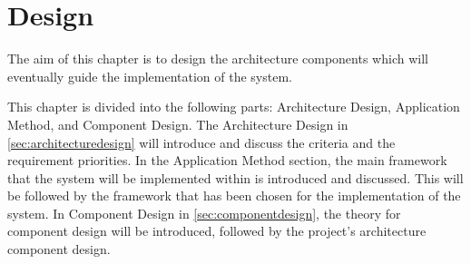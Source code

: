 \chapter{Design}\label{design}
The aim of this chapter is to design the architecture components which will eventually guide the implementation of the system.

This chapter is divided into the following parts: Architecture Design, Application Method, and Component Design.
The Architecture Design in \cref{sec:architecturedesign} will introduce and discuss the criteria and the requirement priorities.
In the Application Method section, the main framework that the system will be implemented within is introduced and discussed.
This will be followed by the framework that has been chosen for the implementation of the system. %
In Component Design in \cref{sec:componentdesign}, the theory for component design will be introduced, followed by the project's architecture component design.





